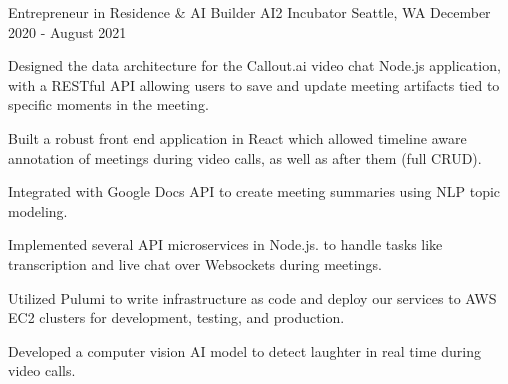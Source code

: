 

\begin{cventries}

  \cventry
    {Entrepreneur in Residence \& AI Builder} %
    {AI2 Incubator} %
    {Seattle, WA} %
    {December 2020 - August 2021} %
    {
      \begin{cvitems} %
        \item {Designed the data architecture for the Callout.ai video chat Node.js application, with a RESTful API allowing users to save and update meeting artifacts tied to specific moments in the meeting.}
        \item {Built a robust front end application in React which allowed timeline aware annotation of meetings during video calls, as well as after them (full CRUD).}
        \item {Integrated with Google Docs API to create meeting summaries using NLP topic modeling.}
        \item {Implemented several API microservices in Node.js. to handle tasks like transcription and live chat over Websockets during meetings.}
        \item {Utilized Pulumi to write infrastructure as code and deploy our services to AWS EC2 clusters for development, testing, and production.}
        \item {Developed a computer vision AI model to detect laughter in real time during video calls.}
      \end{cvitems}
    }


\end{cventries}
